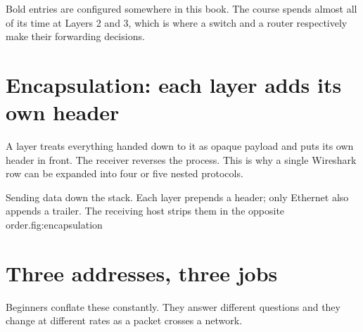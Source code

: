 \begin{keyidea}
Bold entries are configured somewhere in this book. The course spends
almost all of its time at Layers 2 and 3, which is where a switch and a
router respectively make their forwarding decisions.
\end{keyidea}

\section*{Encapsulation: each layer adds its own header}
A layer treats everything handed down to it as opaque payload and puts
its own header in front. The receiver reverses the process. This is why
a single Wireshark row can be expanded into four or five nested
protocols.

\begin{utpfig}[Encapsulation]{Sending data down the stack. Each layer prepends a
header; only Ethernet also appends a trailer. The receiving host strips them in
the opposite order.}{fig:encapsulation}
\end{utpfig}

\section*{Three addresses, three jobs}
Beginners conflate these constantly. They answer different questions and
they change at different rates as a packet crosses a network.

